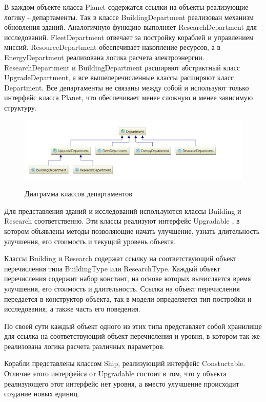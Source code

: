 В каждом объекте класса Planet содержатся ссылки на объекты реализующие логику - департаменты. Так в классе BuildingDepartment реализован механизм обновления зданий. Аналогичную функцию выполняет ResearchDepartment для исследований. FleetDepartment отвечает за постройку кораблей и управлением миссий. ResourceDepartment обеспечивает накопление ресурсов, а в EnergyDepartment  реализована логика расчета электроэнергии. ResearchDepartment и BuildingDepartment расширяют абстрактный класс UpgradeDepartment, а все вышеперечисленные классы расширяют класс Department. Все департаменты не связаны между собой и используют только интерфейс класса Planet, что обеспечивает менее сложную и менее зависимую структуру.

\begin{figure}[H]
\centering
\includegraphics[scale=0.5]{d1.png}
\label{pic:d1}
\caption{Диаграмма классов  департаментов}
\end{figure}

Для представления зданий и исследований используются классы Building  и Research  соответственно. Эти классы реализуют интерфейс Upgradable , в котором объявлены методы позволяющие начать улучшение, узнать длительность улучшения, его стоимость и текущий уровень объекта.

Классы Building и Research содержат ссылку на соответствующий объект перечисления типа BuildingType   или
 ResearchType. Каждый объект перечисления содержит набор констант, на основе которых вычисляется время улучшения, его стоимость и длительность. Ссылка на объект перечисления передается в конструктор объекта, так в модели определяется тип постройки и исследования, а также часть его поведения.

По своей сути каждый объект одного из этих типа представляет собой хранилище для ссылка на соответствующий объект перечисления и уровня, в котором так же реализована логика расчета различных параметров. 

Корабли представлены классом Ship, реализующий интерфейс Constuctable. Отличие этого интерфейса от Upgradable состоит в том, что у объекта реализующего этот интерфейс нет уровня, а вместо улучшение происходит создание новых единиц.

